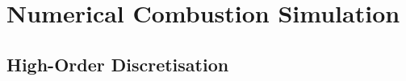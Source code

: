 \section{Numerical Combustion Simulation}

\cite{orszag1970AnalyticalTheoriesTurbulence, domingo2023RecentDevelopmentsDNS, chen2011PetascaleDirectNumerical, yang2015LargeeddySimulationPresent, veynante2002TurbulentCombustionModeling, moin1998DirectNumericalSimulation, tennekes1972FirstCourseTurbulence}





\subsection{High-Order Discretisation}




